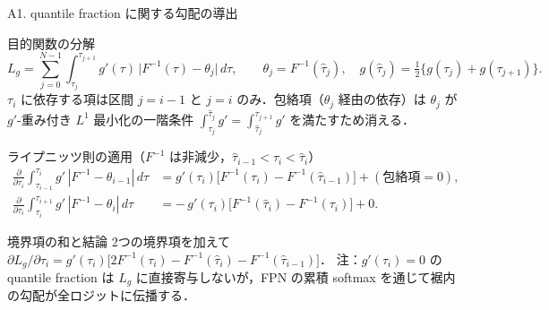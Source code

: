 \documentclass[aspectratio=169, 10pt]{beamer}
\providecommand{\Finv}{}\renewcommand{\Finv}{F^{-1}}
\newcommand{\Lg}{L_g}
\begin{document}
\begin{frame}{A1. quantile fraction に関する勾配の導出}
  \footnotesize
  \begin{block}{目的関数の分解}
    \[
      \Lg=\textstyle\sum_{j=0}^{N-1}\int_{\tau_j}^{\tau_{j+1}} g'(\tau)\,\bigl|\Finv(\tau)-\theta_j\bigr|\,d\tau,
      \qquad \theta_j=\Finv(\hat\tau_j),\quad g(\hat\tau_j)=\tfrac12\{g(\tau_j)+g(\tau_{j+1})\}.
    \]
    $\tau_i$ に依存する項は区間 $j=i-1$ と $j=i$ のみ．包絡項（$\theta_j$ 経由の依存）は
    $\theta_j$ が $g'$-重み付き $L^1$ 最小化の一階条件 $\int_{\tau_j}^{\hat\tau_j}g'=\int_{\hat\tau_j}^{\tau_{j+1}}g'$ を満たすため消える．
  \end{block}
  \begin{block}{ライプニッツ則の適用（$\Finv$ は非減少，$\hat\tau_{i-1}<\tau_i<\hat\tau_i$）}
    \begin{align*}
      \frac{\partial}{\partial\tau_i}\int_{\tau_{i-1}}^{\tau_i} g'\,|\Finv-\theta_{i-1}|\,d\tau
      &= g'(\tau_i)\bigl[\Finv(\tau_i)-\Finv(\hat\tau_{i-1})\bigr] + (\text{包絡項}=0), \\
      \frac{\partial}{\partial\tau_i}\int_{\tau_i}^{\tau_{i+1}} g'\,|\Finv-\theta_i|\,d\tau
      &= -\,g'(\tau_i)\bigl[\Finv(\hat\tau_i)-\Finv(\tau_i)\bigr] + 0 .
    \end{align*}
  \end{block}
  \begin{exampleblock}{境界項の和と結論}
    2つの境界項を加えて
    $\partial\Lg/\partial\tau_i=g'(\tau_i)\bigl[2\Finv(\tau_i)-\Finv(\hat\tau_i)-\Finv(\hat\tau_{i-1})\bigr]$．
    注：$g'(\tau_i)=0$ の quantile fraction は $\Lg$ に直接寄与しないが，FPN の累積 softmax を通じて裾内の勾配が全ロジットに伝播する．
  \end{exampleblock}
\end{frame}
\end{document}
